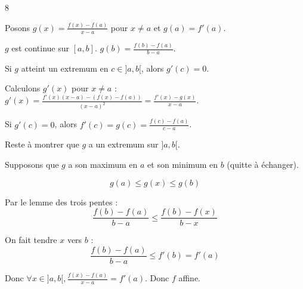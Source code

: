 \begin{correction}{8}

    Posons $g(x) = \frac{f(x)-f(a)}{x-a}$ pour $x \ne a$ et $g(a)=f'(a)$.

    $g$ est continue sur $[a,b]$.
    $g(b) = \frac{f(b)-f(a)}{b-a}$.

    Si $g$ atteint un extremum en $c \in ]a,b[$, alors $g'(c)=0$.

    Calculons $g'(x)$ pour $x \ne a$ : $g'(x) = \frac{f'(x)(x-a) - (f(x)-f(a))}{(x-a)^2} = \frac{f'(x)-g(x)}{x-a}$.

    Si $g'(c)=0$, alors $f'(c) = g(c) = \frac{f(c)-f(a)}{c-a}$.

    Reste à montrer que $g$ a un extremum sur $]a,b[$.

    Supposons que $g$ a son maximum en $a$ et son minimum en $b$ (quitte à échanger).
    
    $$g(a) \leqslant g(x) \leqslant g(b)$$

    Par le lemme des trois pentes :
    $$\frac{f(b) - f(a)}{b-a} \leqslant \frac{f(b) - f(x)}{b-x}$$

    On fait tendre $x$ vers $b$ :
    $$\frac{f(b) - f(a)}{b-a} \leqslant f'(b) = f'(a)$$

    Donc $\forall x \in ]a,b[, \frac{f(x) -f(a)}{x-a} = f'(a)$.
    Donc $f$ affine.
\end{correction}

